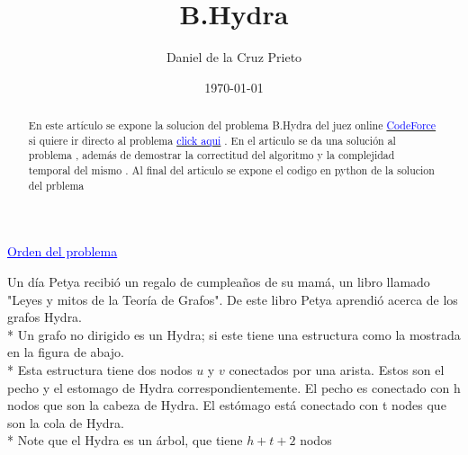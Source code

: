 \documentclass[12pt]{article}
\begin{document}
    \title{B.Hydra} 
    \author{Daniel de la Cruz Prieto} 
    \date{\today} 
    \maketitle

    \begin{abstract}
        \noindent En este art\'iculo se expone la solucion del problema B.Hydra del juez online \href{https://codeforces.com/} { \textcolor{blue}{CodeForce} }  
        si quiere ir directo al problema \href{https://codeforces.com/problemset/problem/243/B}{\textcolor{blue}{click aqui}} . En el articulo se da una soluci\'on al problema , adem\'as de 
        demostrar la correctitud del algoritmo y la complejidad temporal del mismo . Al final del articulo se expone el codigo en python de la solucion del prblema   
    \end{abstract}

    \vspace{1cm}
    \noindent \textcolor{blue}{\Large \underline{Orden del problema } }
    \begin{flushleft}
        Un d\'ia Petya recibi\'o un regalo de cumplea\~nos de su mam\'a, un libro llamado "Leyes y mitos de la Teor\'ia de Grafos". De este libro Petya aprendi\'o acerca de los grafos Hydra.
        \\*
        Un grafo no dirigido es un Hydra; si este tiene una estructura como la mostrada en la figura de abajo.
        \\*
        Esta estructura tiene dos nodos $u$ y $v$ conectados por una arista. Estos son el pecho y el estomago de Hydra
        correspondientemente. El pecho es conectado con h nodos que son la cabeza de Hydra. El est\'omago est\'a conectado con t nodes que son la cola de Hydra.
        \\*
        Note que el Hydra es un \'arbol, que tiene $h+t+2$ nodos
    \end{flushleft}
    
\end{document}
